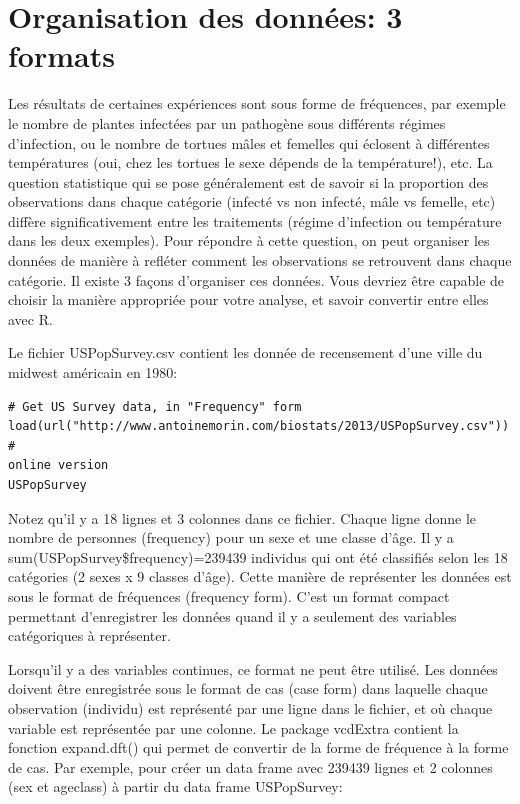 \documentclass[12pt,]{book}
\begin{document}
\hypertarget{organisation-des-donnuxe9es-3-formats}{%
\section{Organisation des données: 3 formats}\label{organisation-des-donnuxe9es-3-formats}}

Les résultats de certaines expériences sont sous forme de fréquences,
par exemple le nombre de plantes infectées par un pathogène sous
différents régimes d'infection, ou le nombre de tortues mâles et
femelles qui éclosent à différentes températures (oui, chez les tortues
le sexe dépends de la température!), etc. La question statistique qui se
pose généralement est de savoir si la proportion des observations dans
chaque catégorie (infecté vs non infecté, mâle vs femelle, etc) diffère
significativement entre les traitements (régime d'infection ou
température dans les deux exemples). Pour répondre à cette question,
on peut organiser les données de manière à refléter comment les
observations se retrouvent dans chaque catégorie. Il existe 3 façons
d'organiser ces données. Vous devriez être capable de choisir la
manière appropriée pour votre analyse, et savoir convertir entre elles
avec R.

Le fichier USPopSurvey.csv contient les donnée de recensement
d'une ville du midwest américain en 1980:

\begin{verbatim}
# Get US Survey data, in "Frequency" form
load(url("http://www.antoinemorin.com/biostats/2013/USPopSurvey.csv")) #
online version
USPopSurvey
\end{verbatim}

Notez qu'il y a 18 lignes et 3 colonnes dans ce fichier. Chaque ligne
donne le nombre de personnes (frequency) pour un sexe et une classe
d'âge. Il y a sum(USPopSurvey\$frequency)=239439 individus qui ont
été classifiés selon les 18 catégories (2 sexes x 9 classes d'âge). Cette
manière de représenter les données est sous le format de fréquences
(frequency form). C'est un format compact permettant d'enregistrer
les données quand il y a seulement des variables catégoriques à
représenter.

Lorsqu'il y a des variables continues, ce format ne peut être utilisé. Les
données doivent être enregistrée sous le format de cas (case form)
dans laquelle chaque observation (individu) est représenté par une
ligne dans le fichier, et où chaque variable est représentée par une
colonne. Le package vcdExtra contient la fonction expand.dft() qui
permet de convertir de la forme de fréquence à la forme de cas. Par
exemple, pour créer un data frame avec 239439 lignes et 2 colonnes
(sex et ageclass) à partir du data frame USPopSurvey:
\end{document}

